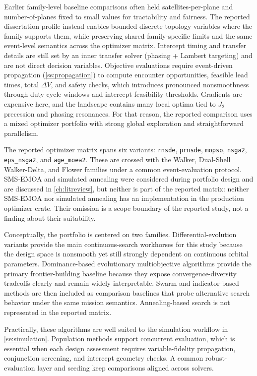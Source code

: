     Earlier family-level baseline comparisons often held satellites-per-plane and number-of-planes fixed to small values for tractability and fairness. The reported dissertation profile instead enables bounded discrete topology variables where the family supports them, while preserving shared family-specific limits and the same event-level semantics across the optimizer matrix. Intercept timing and transfer details are still set by an inner transfer solver (phasing + Lambert targeting) and are not direct decision variables. Objective evaluations require event-driven propagation (\cref{ss:propagation}) to compute encounter opportunities, feasible lead times, total $\Delta V$, and safety checks, which introduces pronounced nonsmoothness through duty-cycle windows and intercept-feasibility thresholds. Gradients are expensive here, and the landscape contains many local optima tied to $J_2$ precession and phasing resonances. For that reason, the reported comparison uses a mixed optimizer portfolio with strong global exploration and straightforward parallelism.

        The reported optimizer matrix spans six variants: \texttt{rnsde}, \texttt{prnsde}, \texttt{mopso}, \texttt{nsga2}, \texttt{eps\_nsga2}, and \texttt{age\_moea2}. These are crossed with the Walker, Dual-Shell Walker-Delta, and Flower families under a common event-evaluation protocol. SMS-EMOA and simulated annealing were considered during portfolio design and are discussed in \cref{ch:litreview}, but neither is part of the reported matrix: neither SMS-EMOA nor simulated annealing has an implementation in the production optimizer crate. Their omission is a scope boundary of the reported study, not a finding about their suitability.

        Conceptually, the portfolio is centered on two families. Differential-evolution variants provide the main continuous-search workhorses for this study because the design space is nonsmooth yet still strongly dependent on continuous orbital parameters. Dominance-based evolutionary multiobjective algorithms provide the primary frontier-building baseline because they expose convergence-diversity tradeoffs clearly and remain widely interpretable. Swarm and indicator-based methods are then included as comparison baselines that probe alternative search behavior under the same mission semantics. Annealing-based search is not represented in the reported matrix.

        Practically, these algorithms are well suited to the simulation workflow in \cref{se:simulation}. Population methods support concurrent evaluation, which is essential when each design assessment requires variable-fidelity propagation, conjunction screening, and intercept geometry checks. A common robust-evaluation layer and  seeding keep comparisons aligned across solvers.

